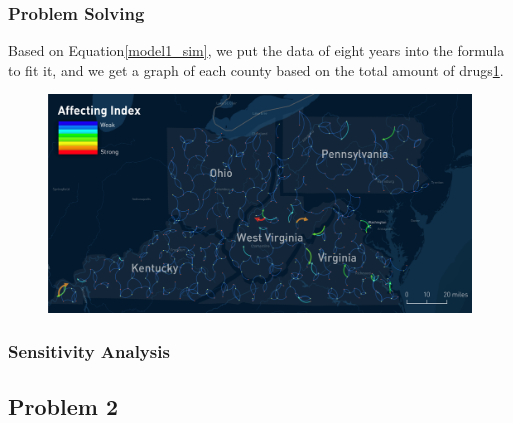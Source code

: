 \documentclass{mcmthesis}
\begin{document}
\subsubsection{Problem Solving}
Based on Equation\eqref{model1_sim}, we put the data of eight years into the formula to fit it, and we get a graph of each county based on the total amount of drugs\ref{all_relation}.
\begin{figure}[ht]
	\centering
	\includegraphics[width=15cm]{figure-release/Model1.FlowMap.png}
	\caption{}\label{all_relation}
\end{figure}



\subsubsection{Sensitivity Analysis}

\subsection{Problem 2}
\end{document}
